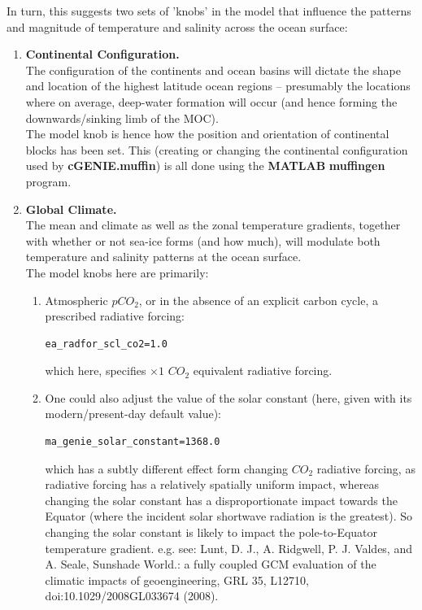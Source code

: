 \documentclass[11pt,fleqn]{book} %
\begin{document}
In turn, this suggests two sets of 'knobs' in the model that influence the patterns and magnitude of temperature and salinity across the ocean surface:

\vspace{2mm}
\begin{enumerate}
\item \textbf{Continental Configuration.}
\\The configuration of the continents and ocean basins will dictate the shape and location of the highest latitude ocean regions -- presumably the locations where on average, deep-water formation will occur (and hence forming the downwards/sinking limb of the MOC).
\\The model knob is hence how the position and orientation of continental blocks has been set. This (creating or changing the continental configuration used by \textbf{cGENIE.muffin}) is all done using the \textbf{MATLAB} \textbf{muffingen} program.
\vspace{2mm}
\item \textbf{Global Climate.}
\\The mean and climate as well as the zonal temperature gradients, together with whether or not sea-ice forms (and how much), will modulate both temperature and salinity patterns at the ocean surface.
\\The model knobs here are primarily:
\begin{enumerate}
\item Atmospheric \(pCO_{2}\), or in the absence of an explicit carbon cycle, a prescribed radiative forcing:
\vspace{-2pt}\begin{verbatim}
ea_radfor_scl_co2=1.0
\end{verbatim}\vspace{-2pt}
which here, specifies \(\times1\) \(CO_{2}\) equivalent radiative forcing.
\item One could also adjust the value of the solar constant (here, given with its modern/present-day default value):
\vspace{-2pt}\begin{verbatim}
ma_genie_solar_constant=1368.0
\end{verbatim}\vspace{-2pt}
which has a subtly different effect form changing \(CO_{2}\) radiative forcing, as radiative forcing has a relatively spatially uniform impact, whereas changing the solar constant has a disproportionate impact towards the Equator (where the incident solar shortwave radiation is the greatest). So changing the solar constant is likely to impact the pole-to-Equator temperature gradient. e.g. see: Lunt, D. J., A. Ridgwell, P. J. Valdes, and A. Seale, Sunshade World.: a fully coupled GCM evaluation of the climatic impacts of geoengineering, GRL 35, L12710, doi:10.1029/2008GL033674 (2008).

\end{enumerate}
\end{enumerate}
\end{document}

